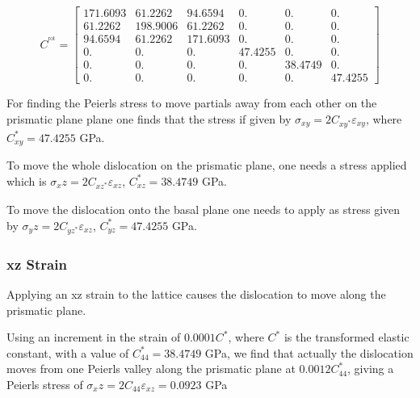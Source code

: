 \documentclass[11pt]{article}
\begin{document}
\begin{equation*}
 C^{}^{\text{rot} }=	
  \begin{bmatrix}
   171.6093 &  61.2262 &  94.6594 &   0.     &   0.      &  0.      \\
    61.2262 & 198.9006 &  61.2262 &   0.     &   0.      &  0.      \\
    94.6594 &  61.2262 & 171.6093 &   0.     &   0.      &  0.      \\
     0.     &   0.     &   0.     &  47.4255 &   0.      &  0.      \\
     0.     &   0.     &   0.     &   0.     &  38.4749  &  0.      \\
     0.     &   0.     &   0.     &   0.     &   0.      & 47.4255  
  \end{bmatrix}
\end{equation*}



For finding the Peierls stress to move partials away from each
other on the prismatic plane plane one finds that the stress if
given by \(\sigma_{xy} = 2C_{xy}_{}^{*}\varepsilon_{xy}\), where \(C_{xy}^{*} =
    47.4255\) GPa.

To move the whole dislocation on the prismatic plane, one needs a
stress applied which is \(\sigma_xz = 2C_{xz}_{}^{*}\varepsilon_{xz}\), \(C_{xz}^{*} =
    38.4749\) GPa.

To move the dislocation onto the basal plane one needs to apply as
stress given by \(\sigma_yz = 2C_{yz}_{}^{*}\varepsilon_{xz}\), \(C_{yz}^{*} =
    47.4255\) GPa.



\subsubsection{xz Strain}
\label{sec:org23b2c84}

Applying an xz strain to the lattice causes the dislocation to
move along the prismatic plane. 

Using an increment in the strain of \(0.0001C^{*}\), where \(C^{*}\) is
the transformed elastic constant, with a value of \(C_{44}^{*}=38.4749\)
GPa, we find that actually the dislocation moves from one Peierls
valley along the prismatic plane at \(0.0012C_{44}^{*}\), giving a Peierls
stress of \(\sigma_xz = 2C_{44}\varepsilon_{xz} = 0.0923\) GPa
\end{document}
